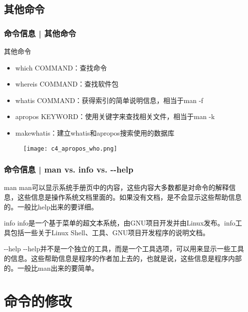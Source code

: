 \subsection{其他命令}
\begin{frame}
  \frametitle{命令信息 | 其他命令}
  \begin{block}{其他命令}
    \begin{itemize}
      \item which COMMAND：查找命令
      \item whereis COMMAND：查找软件包
      \item whatis COMMAND：获得索引的简单说明信息，相当于man -f
      \item apropos KEYWORD：使用关键字来查找相关文件，相当于man -k
      \item makewhatis：建立whatis和apropos搜索使用的数据库
    \end{itemize}
  \end{block}
  \begin{figure}
    \centering
    \texttt{[image: c4\_apropos\_who.png]}
  \end{figure}
\end{frame}

\begin{frame}[fragile]
  \frametitle{命令信息 | man vs. info vs. -\!-help}
  \begin{block}{man}
    man可以显示系统手册页中的内容，这些内容大多数都是对命令的解释信息，这些信息是操作系统文档里面的。如果没有文档，是不会显示这些帮助信息的。一般比help出来的要详细。
  \end{block}
  \pause
  \begin{block}{info}
    info是一个基于菜单的超文本系统，由GNU项目开发并由Linux发布。info工具包括一些关于Linux Shell、工具、GNU项目开发程序的说明文档。
  \end{block}
  \pause
  \begin{block}{-\!-help}
-\!-help并不是一个独立的工具，而是一个工具选项，可以用来显示一些工具的信息。这些帮助信息是程序的作者加上去的，也就是说，这些信息是程序内部的。一般比man出来的要简单。
  \end{block}
\end{frame}

\section{命令的修改}
